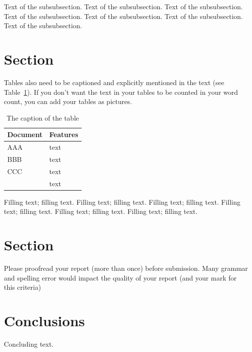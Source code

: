 \documentclass[11pt]{article}
\begin{document}
Text of the subsubsection.
Text of the subsubsection.
Text of the subsubsection.
Text of the subsubsection.
Text of the subsubsection.
Text of the subsubsection.
Text of the subsubsection.

\section{Section}
Tables also need to be captioned and explicitly mentioned in the text (see Table~\ref{table1}). If you don't want the text in your tables to be counted in your word count, you can add your tables as pictures.

\begin{table}[h]
	\begin{center}
		\begin{tabular}{|l|l|}			
			\hline
			Document & Features\\
			\hline\hline
			AAA & text\\
			BBB & text\\
			CCC & text\\
			& text\\
			\hline
			
		\end{tabular}
		\caption{The caption of the table}
		\label{table1}
		
	\end{center}
\end{table}

Filling text; filling text.
Filling text; filling text.
Filling text; filling text.
Filling text; filling text.
Filling text; filling text.
Filling text; filling text.

\section{Section}

Please proofread your report (more than once) before submission. Many grammar and spelling error would impact the quality of your report (and your mark for this criteria)

\section{Conclusions}

Concluding text.



\end{document}
